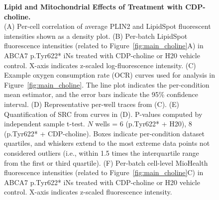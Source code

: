 
\clearpage


\clearpage

\begin{figure}[ht]
    \caption{
        \textbf{Lipid and Mitochondrial Effects of Treatment with CDP-choline.}\\[1ex]
        (A) Per-cell correlation of average PLIN2 and LipidSpot fluorescent intensities shown as a density plot. 
        (B) Per-batch LipidSpot fluorescence intensities (related to Figure~\ref{fig:main_choline}A) in ABCA7 p.Tyr622* iNs treated with CDP-choline or H20 vehicle control. X-axis indicates z-scaled log-fluorescence intensity. 
        (C) Example oxygen consumption rate (OCR) curves used for analysis in Figure~\ref{fig:main_choline}. The line plot indicates the per-condition mean estimator, and the error bars indicate the 95\% confidence interval. 
        (D) Representative per-well traces from (C). 
        (E) Quantification of SRC from curves in (D). P-values computed by independent sample t-test. $N$ wells = 6 (p.Tyr622* + H20), 8 (p.Tyr622* + CDP-choline). Boxes indicate per-condition dataset quartiles, and whiskers extend to the most extreme data points not considered outliers (i.e., within 1.5 times the interquartile range from the first or third quartile). 
        (F) Per-batch cell-level MioHealth fluorescence intensities (related to Figure~\ref{fig:main_choline}C) in ABCA7 p.Tyr622* iNs treated with CDP-choline or H20 vehicle control. X-axis indicates z-scaled fluorescence intensity.
    }
    \label{fig:lipid_mitochondrial_effects_CDP_choline}
\end{figure}

